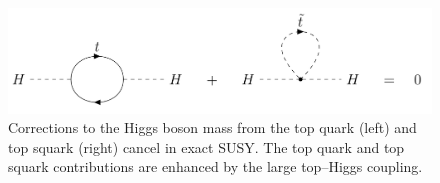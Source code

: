 \begin{figure}[hbtp]
\centering
\includegraphics[scale=0.3]{figures/intro/higgs_top_stop_corrections.png}
\caption{Corrections to the Higgs boson mass from the top quark (left) and top squark (right) cancel in exact SUSY. The top quark and top squark contributions are enhanced by the large top--Higgs coupling.}
\label{higgs_top_stop_corrections}
\end{figure}